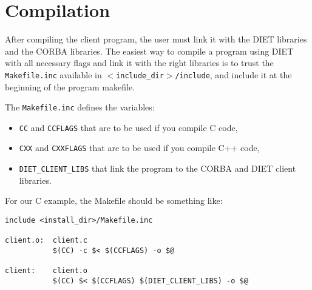 \section{Compilation}
\label{sec:cl_comp}

After compiling the client program, the user must link it with the DIET
libraries and the CORBA libraries. The easiest way to compile a program using
DIET with all necessary flags and link it with the right libraries is to trust the
\texttt{Makefile.inc} available in \texttt{$<$include\_dir$>$/include}, and
include it at the beginning of the program makefile.

The \texttt{Makefile.inc} defines the variables:
\begin{itemize}
\item \texttt{CC} and \texttt{CCFLAGS} that are to be used if you compile C
 code,
\item \texttt{CXX} and \texttt{CXXFLAGS} that are to be used if you compile C++
  code,
\item \texttt{DIET\_CLIENT\_LIBS} that link the program to the CORBA and DIET
  client libraries.
\end{itemize}

For our C example, the Makefile should be something like:
{\footnotesize
\begin{verbatim}
include <install_dir>/Makefile.inc

client.o:  client.c
           $(CC) -c $< $(CCFLAGS) -o $@

client:    client.o
           $(CC) $< $(CCFLAGS) $(DIET_CLIENT_LIBS) -o $@
\end{verbatim}
}

